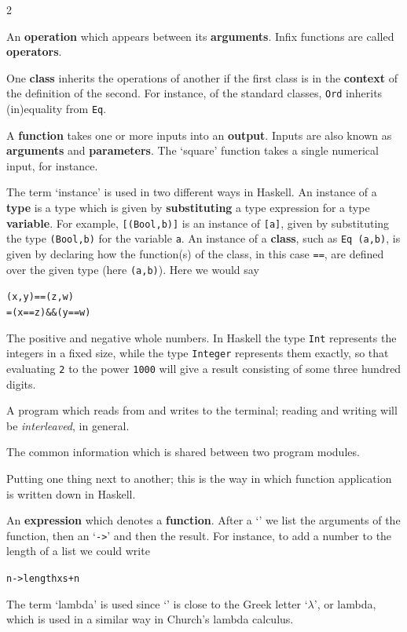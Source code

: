 \begin{multicols}{2}
{
An \textbf{operation} which appears between its \textbf{arguments}. Infix functions
are called \textbf{operators}.

One \textbf{class} inherits the operations of another if the first class is in
the \textbf{context} of the definition of the second. For instance, of the
standard classes, \texttt{Ord} inherits (in)equality from \texttt{Eq}.

A \textbf{function} takes one or more inputs into an \textbf{output}. Inputs
are also known as \textbf{arguments} and \textbf{parameters}. The `square'
function takes a single numerical input, for instance.

The term `instance' is used in two different ways in Haskell.
\itempar
An instance of a \textbf{type}
is a type which is given by \textbf{substituting} a type expression for a
type \textbf{variable}. For example, \texttt{[(Bool,b)]} is an instance of 
\texttt{[a]}, given by substituting the type
\texttt{(Bool,b)} for the variable \texttt{a}.
\itempar
An instance of a \textbf{class}, such as \texttt{Eq (a,b)},
is given by declaring how the function(s) of the class, in this case \texttt{==},
are defined over the given type (here \texttt{(a,b)}). Here we would say
\begin{alltt}
(x,y) == (z,w)
  = (x==z) \&\& (y==w)
\end{alltt}

The positive and negative whole numbers. In Haskell the type \texttt{Int}
represents the integers in a fixed size, while the type \texttt{Integer}
represents them 
exactly, so that evaluating \texttt{2} to the power \texttt{1000} will give a
result consisting of some three hundred digits.

A program which reads from and writes to the terminal; reading and writing
will be {\em interleaved}, in general.

The common information which is shared between two program modules.

Putting one thing next to another; this is the way in which function
application is written down in Haskell.

An \textbf{expression} which denotes a \textbf{function}. After a `\texttt{\bs{}}' we
list the arguments of the function, then an `\texttt{->}' and then the result.
For instance, to add a number to the length of a list we could write
\begin{alltt}
 n -> length xs + n
\end{alltt}
The term `lambda' is used since `\texttt{\bs{}}' is close to the Greek letter
`$\lambda$', or lambda, which is used in a similar way in Church's
lambda calculus.

}
\end{multicols}
